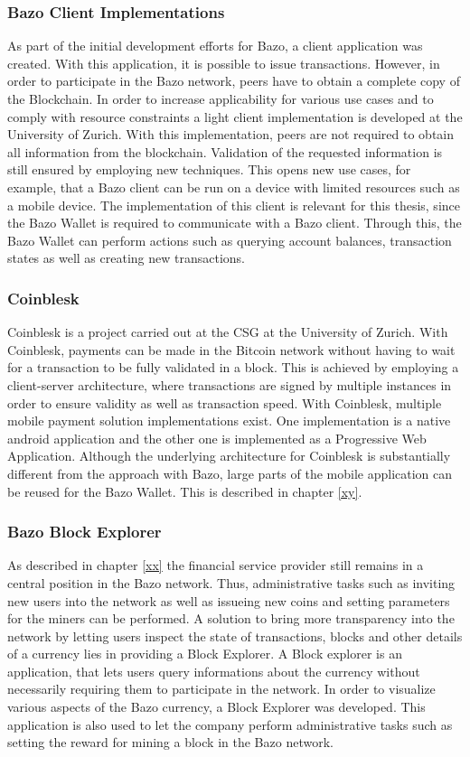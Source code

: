\documentclass[a4paper]{article}
\begin{document}
\subsubsection{Bazo Client Implementations}
As part of the initial development efforts for Bazo, a client application was created. With this application, it is possible to issue transactions. However, in order to participate in the Bazo network, peers have to obtain a complete copy of the Blockchain. In order to increase applicability for various use cases and to comply with resource constraints a light client implementation is developed at the University of Zurich. With this implementation, peers are not required to obtain all information from the blockchain. Validation of the requested information is still ensured by employing new techniques. This opens new use cases, for example, that a Bazo client can be run on a device with limited resources such as a mobile device.
The implementation of this client is relevant for this thesis, since the Bazo Wallet is required to communicate with a Bazo client. Through this, the Bazo Wallet can perform actions such as querying account balances, transaction states as well as creating new transactions.
\subsubsection{Coinblesk}
Coinblesk is a project carried out at the CSG at the University of Zurich. With Coinblesk, payments can be made in the Bitcoin network without having to wait for a transaction to be fully validated in a block. This is achieved by employing a client-server architecture, where transactions are signed by multiple instances in order to ensure validity as well as transaction speed.
With Coinblesk, multiple mobile payment solution implementations exist. One implementation is a native android application and the other one is implemented as a Progressive Web Application. Although the underlying architecture for Coinblesk is substantially different from the approach with Bazo, large parts of the mobile application can be reused for the Bazo Wallet. This is described in chapter \ref{xy}.
\subsubsection{Bazo Block Explorer}
As described in chapter \ref{xx} the financial service provider still remains in a central position in the Bazo network. Thus, administrative tasks such as inviting new users into the network as well as issueing new coins and setting 
parameters for the miners can be performed.
A solution to bring more transparency into the network by letting users inspect the state of transactions, blocks and other details of a currency lies in providing a Block Explorer. A Block explorer is an application, that lets users query informations about the currency without necessarily requiring them to participate in the network.
In order to visualize various aspects of the Bazo currency, a Block Explorer was developed. This application is also used to let the company perform administrative tasks such as setting the reward for mining a block in the Bazo network.
\newpage
\end{document}
